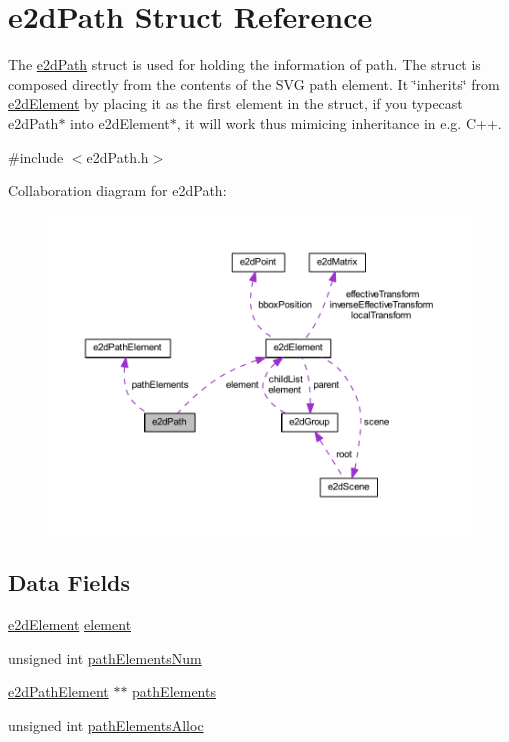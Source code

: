 \hypertarget{structe2dPath}{\section{e2d\-Path Struct Reference}
\label{structe2dPath}
}


The \hyperlink{structe2dPath}{e2d\-Path} struct is used for holding the information of path. The struct is composed directly from the contents of the S\-V\-G path element. It \char`\"{}inherits\char`\"{} from \hyperlink{structe2dElement}{e2d\-Element} by placing it as the first element in the struct, if you typecast e2d\-Path$\ast$ into e2d\-Element$\ast$, it will work thus mimicing inheritance in e.\-g. C++.  




{\ttfamily \#include $<$e2d\-Path.\-h$>$}



Collaboration diagram for e2d\-Path\-:\nopagebreak
\begin{figure}[H]
\begin{center}
\leavevmode
\includegraphics[width=350pt]{structe2dPath__coll__graph}
\end{center}
\end{figure}
\subsection*{Data Fields}
\begin{DoxyCompactItemize}
\item 
\hyperlink{structe2dElement}{e2d\-Element} \hyperlink{structe2dPath_a55bc7a3a0af41fba9e5b91f390c5928c}{element}
\item 
unsigned int \hyperlink{structe2dPath_a225f71916c061d0c977a1e5fae371a99}{path\-Elements\-Num}
\item 
\hyperlink{structe2dPathElement}{e2d\-Path\-Element} $\ast$$\ast$ \hyperlink{structe2dPath_ac0c8a45ff4f8d02e557fb33887743439}{path\-Elements}
\item 
unsigned int \hyperlink{structe2dPath_a0922122c6ccf006fad850c6b30ae5328}{path\-Elements\-Alloc}
\end{DoxyCompactItemize}


